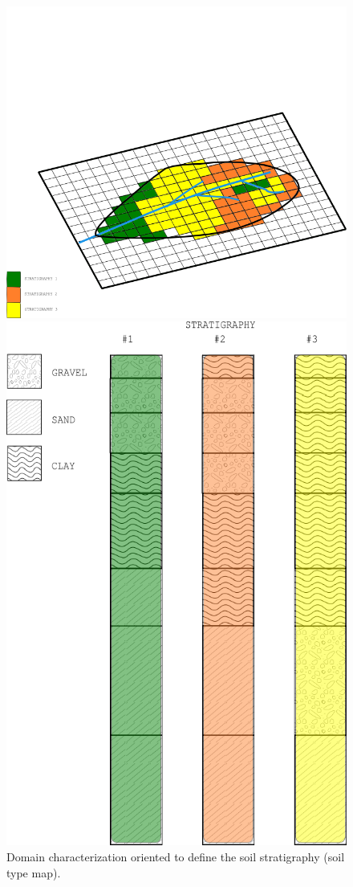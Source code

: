 \begin{figure}[tbp]
\begin{center}
\begin{minipage}[c]{0.35 \textheight}
\centering
\includegraphics[width=1.3 \textwidth]{./images/pic_domain/soil_type_foglia}
\end{minipage}
\vspace{10 mm}
\begin{minipage}[c]{0.5 \textheight}
\centering
\includegraphics[width=0.5 \textwidth]{./images/pic_domain/1Dsoiltype.png}
\end{minipage}
\caption{Domain characterization oriented to define the soil stratigraphy (soil type map).}
\label{Fig_soiltype_foglia}
\end{center}
\end{figure}


